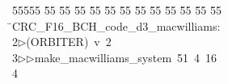 %
%
\begin{tabbing}
55555 \= 55 \= 55 \= 55 \= 55 \= 55 \= 55 \= 55 \= 55 \= 55 \= 55 \= 55 \= 55 \= \>CRC\_F16\_BCH\_code\_d3\_macwilliams:\\[0pt]
2\>$\triangleright$\>(ORBITER)\ v\ 2\ \\[0pt]
3\>$\triangleright$\>$\triangleright$\>make\_macwilliams\_system\ 51\ 4\ 16\\[0pt]
4\>\end{tabbing}
